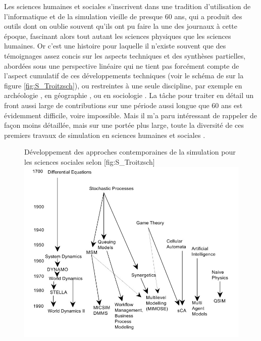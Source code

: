 Les sciences humaines et sociales s'inscrivent dans une tradition d'utilisation de l'informatique et de la simulation vieille de presque 60 ans, qui a produit des outils dont on oublie souvent qu'ils ont pu faire la une des journaux à cette époque, fascinant alors tout autant les sciences physiques que les sciences humaines. Or c'est une histoire pour laquelle il n'existe souvent que des témoignages assez concis sur les aspects techniques  et des synthèses partielles, abordées sous une perspective linéaire qui ne tient pas forcément compte de l'aspect cumulatif  de ces  développements techniques (voir le schéma de \autocite{Troitzsch1997} sur la figure \ref{fig:S_Troitzsch})⁠, ou restreintes à une seule discipline, par exemple en archéologie \autocite{Lake2013}, en géographie \autocite{Sanders2013}, ou en sociologie \autocite{Manzo2007}. La tâche pour traiter en détail un front aussi large de contributions sur une période aussi longue que 60 ans est évidemment difficile, voire impossible. Mais il m'a paru intéressant de rappeler de façon moins détaillée, mais sur une portée plus large, toute la diversité de ces premiers travaux de simulation en sciences humaines et sociales .

\begin{figure}[h]
\begin{sidecaption}{ Développement des approches contemporaines de la simulation pour les sciences sociales selon \textcite{Troitzsch1997}}[fig:S_Troitzsch]
  \centering
 \includegraphics[width=.9\linewidth]{lineaire_figure.jpg}
  \end{sidecaption}
\end{figure}

